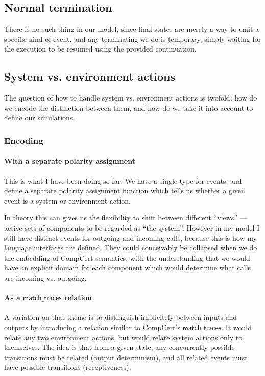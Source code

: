 \documentclass[11pt]{article}
\begin{document}

\subsection{Normal termination} %

There is no such thing in our model,
since final states are merely a way to emit
a specific kind of event,
and any terminating we do is temporary,
simply waiting for the execution to be resumed
using the provided continuation.


\subsection{System vs. environment actions} %

The question of how to handle system vs. envronment actions is twofold:
how do we encode the distinction between them, and
how do we take it into account to define our simulations.

\subsubsection{Encoding} %

\paragraph{With a separate polarity assignment}

This is what I have been doing so far.
We have a single type for events,
and define a separate polarity assignment function
which tells us whether a given event
is a system or environment action.

In theory this can gives us the flexibility to shift between
different ``views'' --- active sets of components to be regarded as ``the system''.
However in my model I still have distinct events
for outgoing and incoming calls,
because this is how my language interfaces are defined.
They could conceivably be collapsed
when we do the embedding of CompCert semantics,
with the understanding that we would have an explicit domain
for each component
which would determine what calls are incoming vs. outgoing.

\paragraph{As a $\mathsf{match\_traces}$ relation}

A variation on that theme is to
distinguish implicitely between inputs and outputs
by introducing a relation similar to CompCert's
$\mathsf{match\_traces}$.
It would relate any two environment actions,
but would relate system actions only to themselves.
The idea is that from a given state,
any concurrently possible transitions must be related
(output determinism),
and all related events must have possible transitions
(receptiveness).
\end{document}
